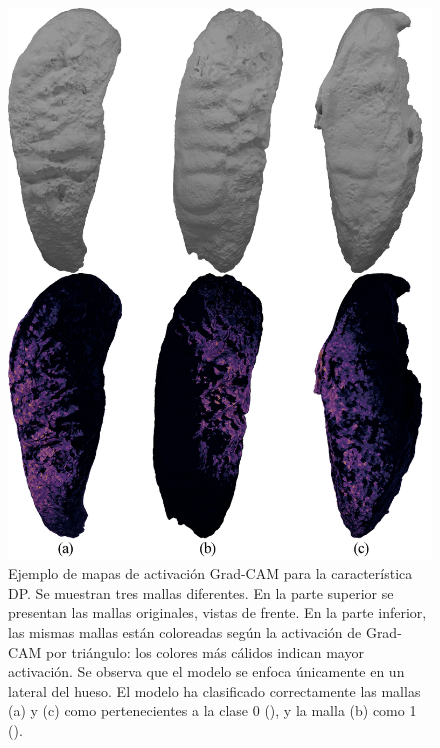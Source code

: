 \begin{figure}[htbp]
    \centering
    \includegraphics[width=\linewidth]{data/grad-cam-DP-samples.png}
    \caption[Ejemplo de mapas de activación Grad-CAM para la característica DP]{Ejemplo de mapas de activación Grad-CAM para la característica DP. Se muestran tres mallas diferentes. En la parte superior se presentan las mallas originales, vistas de frente. En la parte inferior, las mismas mallas están coloreadas según la activación de Grad-CAM por triángulo: los colores más cálidos indican mayor activación. Se observa que el modelo se enfoca únicamente en un lateral del hueso. El modelo ha clasificado correctamente las mallas (a) y (c) como pertenecientes a la clase 0 (), y la malla (b) como 1 ().}
    \label{fig5:grad_cam__DP_samples}
\end{figure}